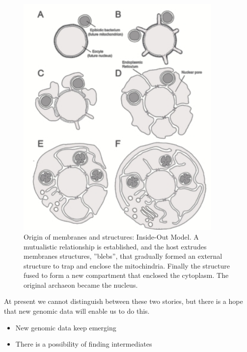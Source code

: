 \documentclass[]{article}
\begin{document}
\begin{figure}[H]
	\caption[Origin of membranes and structures: Inside-Out Model]{Origin of membranes and structures: Inside-Out Model\cite{baum2014inside}. A mutualistic relationship is established, and the host extrudes membranes structures, ''blebs'', that gradually formed an external structure to trap and enclose the mitochindria. Finally the structure fused to form a new compartment that enclosed the cytoplasm. The original archaeon became the nucleus.}\label{fig:inside:out}
	\includegraphics[width=0.9\textwidth]{InsideOut}
\end{figure}

At present we cannot distinguish between these two stories, but there is a hope that new genomic data will enable us to do this.

\begin{itemize}
	\item New genomic data keep emerging
	\item There is a possibility of finding intermediates
\end{itemize}
\end{document}
